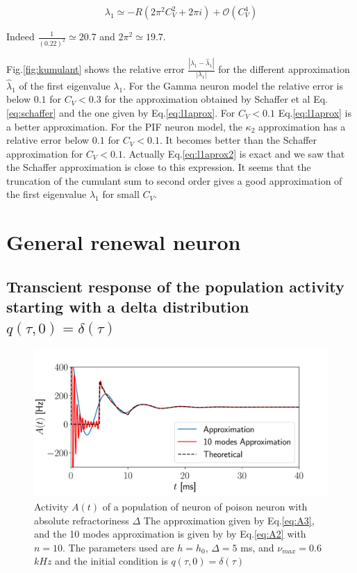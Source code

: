 \documentclass[12pt,twoside]{report}
\begin{document}
\begin{equation}
\label{eq:l1aprox2}
\lambda_1\simeq -R\left(2\pi^2 C_V^2+2\pi i\right) + \mathcal{O}(C_V^4)
\end{equation}

Indeed $\frac{1}{(0.22)^2}\simeq20.7$ and $2\pi^2\simeq19.7$.

Fig.\ref{fig:kumulant} shows the relative error $\frac{|\lambda_1 -\hat{\lambda}_1|}{|\lambda_1|}$ for the different approximation $\hat{\lambda}_1$ of the first eigenvalue $\lambda_1$. For the Gamma  neuron model the relative error is below $0.1$ for $C_V<0.3$ for the approximation obtained by Schaffer et al Eq.\eqref{eq:schaffer} and the one given by Eq.\eqref{eq:l1aprox}. For $C_V<0.1$ Eq.\eqref{eq:l1aprox} is a better approximation. For
the PIF neuron model, the $\kappa_2$ approximation has a relative error below $0.1$ for $C_V<0.1$. It becomes better than the Schaffer approximation for $C_V<0.1$. Actually Eq.\eqref{eq:l1aprox2} is exact and we saw that the Schaffer approximation is close to this expression. It seems that the truncation of the cumulant sum to second order gives a good approximation of the first eigenvalue $\lambda_1$ for small $C_V$. %



\chapter{General renewal neuron}
\label{chap:grene}

\section{Transcient response of the population activity starting with a delta distribution $q(\tau,0)=\delta(\tau)$}

\begin{figure}[h!]
	\centering
	\includegraphics[width=0.8\linewidth]{delta_poisson.pdf}
	\caption{Activity $A(t)$ of a population of neuron of poison neuron with absolute refractoriness $\Delta$ The approximation given by Eq.\eqref{eq:A3}, and the 10 modes approximation is given by  by Eq.\ref{eq:A2} with $n=10$. The parameters used are $h=h_0$, $\Delta=5$ ms, and $\nu_{max}=0.6$ $kHz$  and the initial condition is $q(\tau,0)=\delta(\tau)$}
	\label{fig:delta_poisson}
\end{figure}
\end{document}
